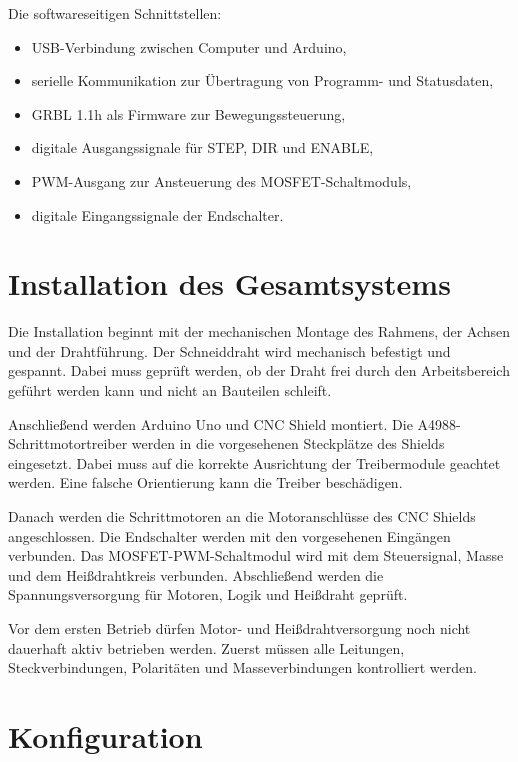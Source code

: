 Die softwareseitigen Schnittstellen:

\begin{itemize}
	\item USB-Verbindung zwischen Computer und Arduino,
	\item serielle Kommunikation zur Übertragung von Programm- und Statusdaten,
	\item GRBL 1.1h als Firmware zur Bewegungssteuerung,
	\item digitale Ausgangssignale für STEP, DIR und ENABLE,
	\item PWM-Ausgang zur Ansteuerung des MOSFET-Schaltmoduls,
	\item digitale Eingangssignale der Endschalter.
\end{itemize}

\section{Installation des Gesamtsystems}
\label{sec:komplettes_system_installation}

Die Installation beginnt mit der mechanischen Montage des Rahmens, der Achsen und der Drahtführung. Der Schneiddraht wird mechanisch befestigt und gespannt. Dabei muss geprüft werden, ob der Draht frei durch den Arbeitsbereich geführt werden kann und nicht an Bauteilen schleift.

Anschließend werden Arduino Uno und CNC Shield montiert. Die A4988-Schrittmotortreiber werden in die vorgesehenen Steckplätze des Shields eingesetzt. Dabei muss auf die korrekte Ausrichtung der Treibermodule geachtet werden. Eine falsche Orientierung kann die Treiber beschädigen.

Danach werden die Schrittmotoren an die Motoranschlüsse des CNC Shields angeschlossen. Die Endschalter werden mit den vorgesehenen Eingängen verbunden. Das MOSFET-PWM-Schaltmodul wird mit dem Steuersignal, Masse und dem Heißdrahtkreis verbunden. Abschließend werden die Spannungsversorgung für Motoren, Logik und Heißdraht geprüft.

Vor dem ersten Betrieb dürfen Motor- und Heißdrahtversorgung noch nicht dauerhaft aktiv betrieben werden. Zuerst müssen alle Leitungen, Steckverbindungen, Polaritäten und Masseverbindungen kontrolliert werden.

\section{Konfiguration}
\label{sec:komplettes_system_konfiguration}

